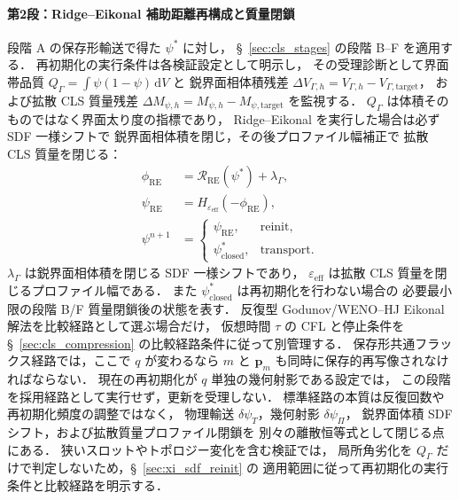 \paragraph{第2段：Ridge--Eikonal 補助距離再構成と質量閉鎖}
段階 A の保存形輸送で得た $\psi^*$ に対し，
§~\ref{sec:cls_stages} の段階 B--F を適用する．
再初期化の実行条件は各検証設定として明示し，
その受理診断として界面帯品質
$Q_\Gamma=\int\psi(1-\psi)\,\mathrm{d}V$ と
鋭界面相体積残差
$\Delta V_{\Gamma,h}=V_{\Gamma,h}-V_{\Gamma,\mathrm{target}}$，
および拡散 CLS 質量残差
$\Delta M_{\psi,h}=M_{\psi,h}-M_{\psi,\mathrm{target}}$ を監視する．
$Q_\Gamma$ は体積そのものではなく界面太り度の指標であり，
Ridge--Eikonal を実行した場合は必ず SDF 一様シフトで
鋭界面相体積を閉じ，その後プロファイル幅補正で
拡散 CLS 質量を閉じる：
\[
  \begin{aligned}
  \phi_{\mathrm{RE}}
    &= \mathcal{R}_{\mathrm{RE}}(\psi^*)+\lambda_\Gamma,\\
  \psi_{\mathrm{RE}}
    &= H_{\varepsilon_{\mathrm{eff}}}(-\phi_{\mathrm{RE}}),\\
  \psi^{n+1}
    &=
  \begin{cases}
    \psi_{\mathrm{RE}}, & \mathrm{reinit},\\
    \psi^*_{\mathrm{closed}}, & \mathrm{transport}.
  \end{cases}
  \end{aligned}
\]
$\lambda_\Gamma$ は鋭界面相体積を閉じる SDF 一様シフトであり，
$\varepsilon_{\mathrm{eff}}$ は拡散 CLS 質量を閉じるプロファイル幅である．
また $\psi^*_{\mathrm{closed}}$ は再初期化を行わない場合の
必要最小限の段階 B/F 質量閉鎖後の状態を表す．
反復型 Godunov/WENO--HJ Eikonal 解法を比較経路として選ぶ場合だけ，
仮想時間 $\tau$ の CFL と停止条件を §~\ref{sec:cls_compression} の比較経路条件に従って別管理する．
保存形共通フラックス経路では，ここで $q$ が変わるなら
$m$ と $\bm{p}_m$ も同時に保存的再写像されなければならない．
現在の再初期化が $q$ 単独の幾何射影である設定では，
この段階を採用経路として実行せず，更新を受理しない．
標準経路の本質は反復回数や再初期化頻度の調整ではなく，
物理輸送 $\delta\psi_T$，幾何射影 $\delta\psi_\Pi$，
鋭界面体積 SDF シフト，および拡散質量プロファイル閉鎖を
別々の離散恒等式として閉じる点にある．
狭いスロットやトポロジー変化を含む検証では，
局所角劣化を $Q_\Gamma$ だけで判定しないため，§~\ref{sec:xi_sdf_reinit} の
適用範囲に従って再初期化の実行条件と比較経路を明示する．

